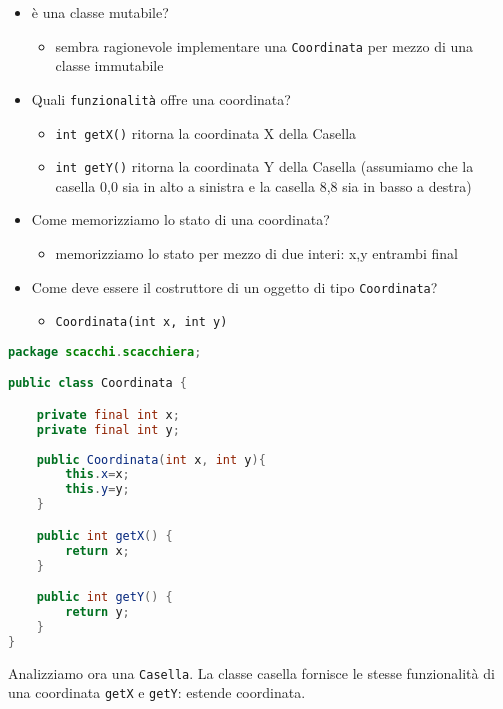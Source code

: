 \documentclass{article}
\begin{document}
\begin{itemize}
\item \`e una classe mutabile?
\begin{itemize}
\item sembra ragionevole implementare una \texttt{Coordinata} per mezzo di una classe immutabile
\end{itemize}
\item Quali \texttt{funzionalit\`a} offre una coordinata? 
\begin{itemize}
\item \texttt{int getX()} ritorna la coordinata X della Casella
\item \texttt{int getY()} ritorna la coordinata Y della Casella (assumiamo che la casella 0,0 sia in alto a sinistra e la casella 8,8 sia in basso a destra)
\end{itemize}
\item Come memorizziamo lo stato di una coordinata?
\begin{itemize}
\item memorizziamo lo stato per mezzo di due interi: x,y entrambi final
\end{itemize}
\item Come deve essere il costruttore di un oggetto di tipo \texttt{Coordinata}?
\begin{itemize}
\item \texttt{Coordinata(int x, int y)}
\end{itemize}
\end{itemize}

\begin{lstlisting}[language=Java,escapechar=|]
package scacchi.scacchiera;

public class Coordinata {

	private final int x;
	private final int y;
	
	public Coordinata(int x, int y){
		this.x=x;
		this.y=y;
	}

	public int getX() {
		return x;
	}

	public int getY() {
		return y;
	}
}

\end{lstlisting}

Analizziamo ora una \texttt{Casella}. La classe casella fornisce le stesse funzionalit\`a di una coordinata \texttt{getX} e \texttt{getY}: estende coordinata. 
\end{document}
